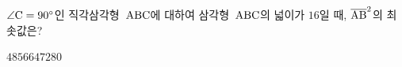 $\angle\mathrm{C}=90^\circ$인 직각삼각형~$\mathrm{ABC}$에 대하여 삼각형~$\mathrm{ABC}$의 넓이가 $16$일 때, $\overline{\mathrm{AB}}^2$의 최솟값은?
\begin{choices32}{$48$}{$56$}{$64$}{$72$}{$80$}\end{choices32}
